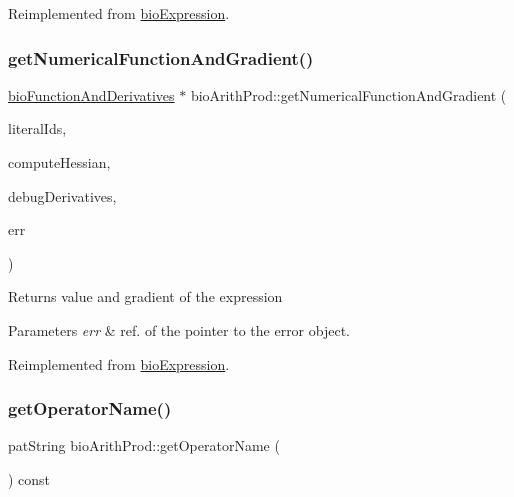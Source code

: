 Reimplemented from \hyperlink{classbio_expression_a3e4b4dca58dbbc6f0e411b30eb3f60b4}{bio\+Expression}.

\mbox{\label{classbio_arith_prod_a6f7d57d9c0ec86aed9bb7eb643beb44e}} 
\subsubsection{\texorpdfstring{get\+Numerical\+Function\+And\+Gradient()}{getNumericalFunctionAndGradient()}}
{\footnotesize\ttfamily \hyperlink{classbio_function_and_derivatives}{bio\+Function\+And\+Derivatives} $\ast$ bio\+Arith\+Prod\+::get\+Numerical\+Function\+And\+Gradient (\begin{DoxyParamCaption}\item[{vector$<$ pat\+U\+Long $>$}]{literal\+Ids,  }\item[{pat\+Boolean}]{compute\+Hessian,  }\item[{pat\+Boolean}]{debug\+Derivatives,  }\item[{pat\+Error $\ast$\&}]{err }\end{DoxyParamCaption})\hspace{0.3cm}{\ttfamily [virtual]}}

\begin{DoxyReturn}{Returns}
value and gradient of the expression 
\end{DoxyReturn}

\begin{DoxyParams}{Parameters}
{\em err} & ref. of the pointer to the error object. \\
\hline
\end{DoxyParams}


Reimplemented from \hyperlink{classbio_expression_a91c81ce80c9e972c913b10f5f3c1ed13}{bio\+Expression}.

\mbox{\label{classbio_arith_prod_a9157df784bda1e1ad425de27e05804b1}} 
\subsubsection{\texorpdfstring{get\+Operator\+Name()}{getOperatorName()}}
{\footnotesize\ttfamily pat\+String bio\+Arith\+Prod\+::get\+Operator\+Name (\begin{DoxyParamCaption}{ }\end{DoxyParamCaption}) const\hspace{0.3cm}{\ttfamily [virtual]}}

